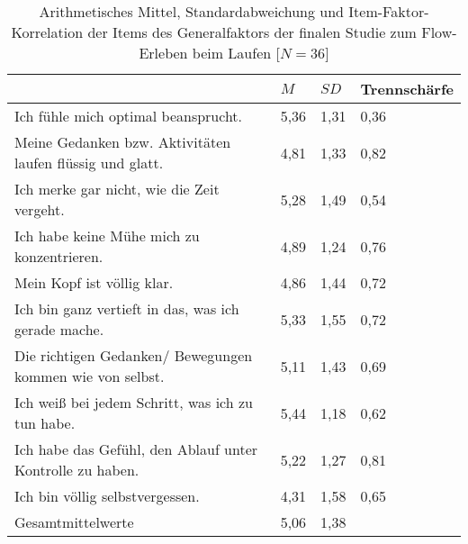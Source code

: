 \pagebreak

\begin{table}[ht]
\centering
	\caption[Item-Faktor-Korrelation der Items des Generalfaktors (Studie: Laufen)]{Arithmetisches Mittel, Standardabweichung und Item-Faktor-Korrelation der Items des Generalfaktors der finalen Studie zum Flow-Erleben beim Laufen [$N = 36$]}
	\label{tab:generalfaktor_studie_laufen}
	\begin{tabularx}{\textwidth}{p{} p{} p{} p{}}
\toprule
& $M$ & $SD$ & Trennschärfe \\
\midrule
Ich fühle mich optimal beansprucht. & 5,36 & 1,31 & 0,36 \\ 
  Meine Gedanken bzw. Aktivitäten laufen flüssig und glatt. & 4,81 & 1,33 & 0,82 \\ 
  Ich merke gar nicht, wie die Zeit vergeht. & 5,28 & 1,49 & 0,54 \\ 
  Ich habe keine Mühe mich zu konzentrieren. & 4,89 & 1,24 & 0,76 \\ 
  Mein Kopf ist völlig klar. & 4,86 & 1,44 & 0,72 \\ 
  Ich bin ganz vertieft in das, was ich gerade mache. & 5,33 & 1,55 & 0,72 \\ 
  Die richtigen Gedanken/ Bewegungen kommen wie von selbst. & 5,11 & 1,43 & 0,69 \\ 
  Ich weiß bei jedem Schritt, was ich zu tun habe. & 5,44 & 1,18 & 0,62 \\ 
  Ich habe das Gefühl, den Ablauf unter Kontrolle zu haben. & 5,22 & 1,27 & 0,81 \\ 
  Ich bin völlig selbstvergessen. & 4,31 & 1,58 & 0,65 \\ 
  Gesamtmittelwerte & 5,06 & 1,38 &  \\ 
\bottomrule
\end{tabularx}
\end{table}

\pagebreak

